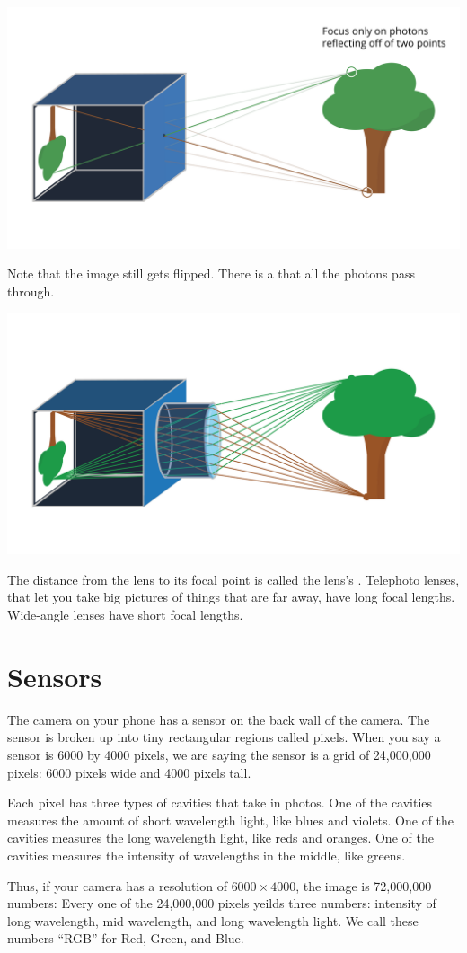 \includegraphics[width=1\textwidth]{pinholePoints.png}



Note that the image still gets flipped.  There is a  that all the photons pass through.

\includegraphics[width=1\textwidth]{lensPoints.png}

The distance from the lens to its focal point is called the lens's
. Telephoto lenses, that let you take big
pictures of things that are far away, have long focal lengths.
Wide-angle lenses have short focal lengths.

\section{Sensors}

The camera on your phone has a sensor on the back wall of the
camera. The sensor is broken up into tiny rectangular regions called
pixels.  When you say a sensor is 6000 by 4000 pixels, we are saying
the sensor is a grid of 24,000,000 pixels: 6000 pixels wide and
4000 pixels tall.

Each pixel has three types of cavities that take in photos. One of the
cavities measures the amount of short wavelength light, like blues and
violets. One of the cavities measures the long wavelength light, like
reds and oranges. One of the cavities measures the intensity of
wavelengths in the middle, like greens.

Thus, if your camera has a resolution of $6000 \times 4000$, the image
is 72,000,000 numbers: Every one of the 24,000,000 pixels yeilds three
numbers: intensity of long wavelength, mid wavelength, and long
wavelength light. We call these numbers ``RGB'' for Red, Green, and
Blue.




